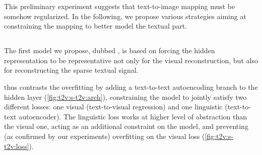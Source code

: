 This preliminary experiment suggests that text-to-image mapping must be somehow regularized.
In the following, we propose various strategies aiming at constraining the mapping to better model the textual part.
\subsection{\sparsettv{}}
\label{subsec:t2v:sparse-t2v}


The first model we propose, dubbed \sparsettv{}, is based on forcing the hidden representation to be representative not only for the visual reconstruction, but also for reconstructing the sparse textual signal.

\sparsettv{} thus contrasts the overfitting by adding a text-to-text autoencoding branch to the hidden layer (\ref{fig:t2v:s-t2v:arch}), constraining the model to jointly satisfy two different losses: one visual (text-to-visual regression) and one linguistic (text-to-text autoencoder).
The linguistic loss works at higher level of abstraction than the visual one, acting as an additional constraint on the model, and preventing (as confirmed by our experiments) overfitting on the visual loss (\ref{fig:t2v:s-t2v:loss}).


